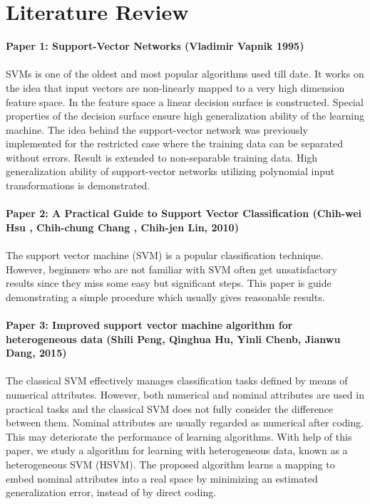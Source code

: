 \documentclass[paper=a4, fontsize=12pt]{scrartcl}
\numberwithin{equation}{section}		%
\numberwithin{figure}{section}			%
\numberwithin{table}{section}				%
\begin{document}
\section{Literature Review}

\textbf{Paper 1: Support-Vector Networks (Vladimir Vapnik 1995)}
\\
\\
SVMs is one of the oldest and most popular algorithms used till date. It works on the idea that input vectors are non-linearly mapped to a very high dimension feature space. In the feature space a linear decision surface is constructed. Special properties of the decision surface ensure high generalization ability of the learning machine. The idea behind the support-vector network was previously implemented for the restricted case where the training data can be separated without errors. Result is extended to non-separable training data. High generalization ability of support-vector networks utilizing polynomial input transformations is demonstrated.
\\
\\
\textbf{Paper 2: A Practical Guide to Support Vector Classification (Chih-wei Hsu , Chih-chung Chang , Chih-jen Lin, 2010)}
\\
\\
The support vector machine (SVM) is a popular classification technique. However, beginners who are not familiar with SVM often get unsatisfactory results since they miss some easy but significant steps. This paper is guide demonstrating a simple procedure which usually gives reasonable results. 
\\
\\
\textbf{Paper 3: Improved support vector machine algorithm for heterogeneous data (Shili Peng, Qinghua Hu, Yinli Chenb, Jianwu Dang, 2015)}
\\
\\
The classical SVM effectively manages classification tasks defined by means of numerical attributes. However, both numerical and nominal attributes are used in practical tasks and the classical SVM does not fully consider the difference between them. Nominal attributes are usually regarded as numerical after coding. This may deteriorate the performance of learning algorithms. With help of this paper, we study a algorithm for learning with heterogeneous data, known as a heterogeneous SVM (HSVM). The proposed algorithm learns a mapping to embed nominal attributes into a real space by minimizing an estimated generalization error, instead of by direct coding.
\end{document}
